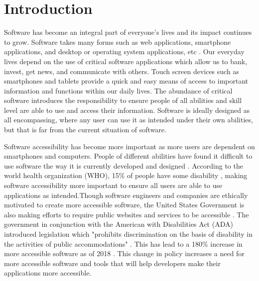 
\section{Introduction}
\label{sec:introduction}

Software has become an integral part of everyone's lives and its impact continues to grow. Software takes many forms such as web applications, smartphone applications, and desktop or operating system applications, etc \cite{Szpiro16}. Our everyday lives depend on the use of critical software applications which allow us to bank, invest, get news, and communicate with others. Touch screen devices such as smartphones and tablets provide a quick and easy means of access to important information and functions within our daily lives. The abundance of critical software introduces the responsibility to ensure people of all abilities and skill level are able to use and access their information. Software is ideally designed as all encompassing, where any user can use it as intended under their own abilities, but that is far from the current situation of software.

Software accessibility has become more important as more users are dependent on smartphones and computers. People of different abilities have found it difficult to use software the way it is currently developed and designed \cite{Park14}. According to the world health organization (WHO), 15\% of people have some disability \cite{WHO}, making software accessibility more important to ensure all users are able to use applications as intended.Though software engineers and companies are ethically motivated to create more accessible software, the United States Government is also making efforts to require public websites and services to be accessible \cite{ADALaws}. The government in conjunction with the American with Disabilities Act (ADA) introduced legislation which "prohibits discrimination on the basis of disability in the activities of public accommodations" \cite{ADALaws,Alshayban20}. This has lead to a 180\% increase in more accessible software as of 2018 \cite{ADAWeb}. This change in policy increases a need for more accessible software and tools that will help developers make their applications more accessible.

